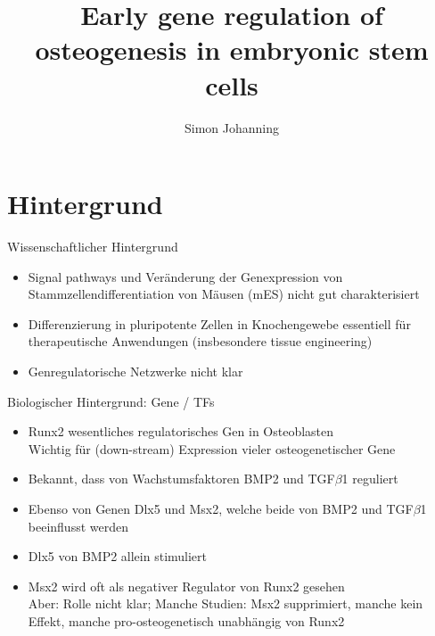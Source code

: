 \documentclass[]{beamer}
\author[Johanning]{Simon Johanning}
\title{Early gene regulation of osteogenesis in embryonic stem cells}
\institute{Institut f\"ur Mathematik und Informatik der Universit\"at Leipzig}
\begin{document}
	
\watermarkoff



\begin{frame}[t,plain]
	\titlepage
\end{frame}


\section{Hintergrund}

\begin{frame}{Wissenschaftlicher Hintergrund}
\begin{itemize}
	\item Signal pathways und Ver\"anderung der Genexpression von Stammzellendifferentiation von M\"ausen (mES) nicht gut charakterisiert
	\pause
	\item Differenzierung in pluripotente Zellen in Knochengewebe essentiell f\"ur therapeutische Anwendungen (insbesondere tissue engineering)
	\pause
	\item Genregulatorische Netzwerke nicht klar
\end{itemize}
\end{frame}

\begin{frame}{Biologischer Hintergrund: Gene / TFs}
\begin{itemize}
	\item Runx2 wesentliches regulatorisches Gen in Osteoblasten
	\pause
	\\ Wichtig f\"ur (down-stream) Expression vieler osteogenetischer Gene
	\pause
	\item Bekannt, dass von Wachstumsfaktoren BMP2 und TGF$\beta$1 reguliert
	\pause
	\item Ebenso von Genen Dlx5 und Msx2, welche beide von BMP2 und TGF$\beta$1 beeinflusst werden
	\pause	
	\item Dlx5 von BMP2 allein stimuliert
	\pause
	\item Msx2 wird oft als negativer Regulator von Runx2 gesehen
	\pause
	\\ Aber: Rolle nicht klar; Manche Studien: Msx2 supprimiert, manche kein Effekt, manche pro-osteogenetisch unabh\"angig von Runx2
\end{itemize}
\end{frame}
\end{document}
